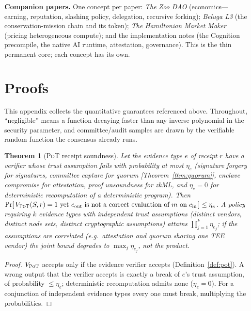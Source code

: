 \documentclass[11pt]{article}
\newtheorem{theorem}{Theorem}
\newcommand{\PoT}{\textsc{PoT}}
\begin{document}
\bigskip
\noindent\textbf{Companion papers.} One concept per paper: \emph{The Zoo DAO} (economics---earning, reputation, slashing policy, delegation, recursive forking); \emph{Beluga L3} (the conservation-mission chain and its token); \emph{The Hamiltonian Market Maker} (pricing heterogeneous compute); and the implementation notes (the Cognition precompile, the native AI runtime, attestation, governance). This is the thin permanent core; each concept has its own.

\appendix
\section{Proofs}
\label{app:proofs}

This appendix collects the quantitative guarantees referenced above. Throughout, ``negligible'' means a function decaying faster than any inverse polynomial in the security parameter, and committee/audit samples are drawn by the verifiable random function the consensus already runs.

\begin{theorem}[\PoT{} receipt soundness]
\label{thm:pot}
Let the evidence type $e$ of receipt $r$ have a verifier whose trust assumption fails with probability at most $\eta_e$ (signature forgery for signatures, committee capture for quorum [Theorem~\ref{thm:quorum}], enclave compromise for attestation, proof unsoundness for zkML, and $\eta_e=0$ for deterministic recomputation of a deterministic program). Then $\Pr[\,V_{\PoT}(S,r)=1 \text{ yet } c_{\mathrm{out}} \text{ is not a correct evaluation of } m \text{ on } c_{\mathrm{in}}\,]\le \eta_e$. A policy requiring $k$ evidence types with \emph{independent} trust assumptions (distinct vendors, distinct node sets, distinct cryptographic assumptions) attains $\prod_{j=1}^k \eta_{e_j}$; if the assumptions are correlated (e.g.\ attestation and quorum sharing one TEE vendor) the joint bound degrades to $\max_j \eta_{e_j}$, not the product.
\end{theorem}
\begin{proof}
$V_{\PoT}$ accepts only if the evidence verifier accepts (Definition~\ref{def:pot}). A wrong output that the verifier accepts is exactly a break of $e$'s trust assumption, of probability $\le\eta_e$; deterministic recomputation admits none ($\eta_e=0$). For a conjunction of independent evidence types every one must break, multiplying the probabilities.
\end{proof}
\end{document}
